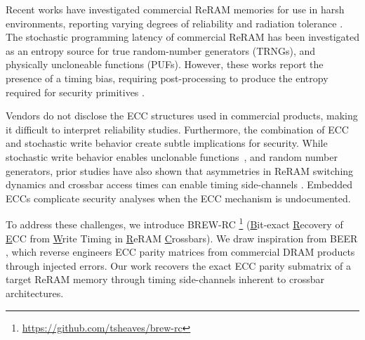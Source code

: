 

Recent works have investigated commercial ReRAM memories for use in harsh environments, reporting varying degrees of reliability and radiation tolerance \cite{yang2014reliability, bi2019total, lyu2021research, korkian2022single}. The stochastic programming latency of commercial ReRAM has been investigated as an entropy source for true random-number generators (TRNGs), and physically uncloneable functions (PUFs). However, these works report the presence of a timing bias, requiring post-processing to produce the entropy required for security primitives \cite{suri2018high, tolga2024trng}.

Vendors do not disclose the ECC structures used in commercial products, making it difficult to interpret reliability studies. 
Furthermore, the combination of ECC and stochastic write behavior create subtle implications for security. While stochastic write behavior enables unclonable functions~, and random number generators, prior studies have also shown that asymmetries in ReRAM switching dynamics and crossbar access times can enable timing side-channels \cite{kommareddy2019crossbar, khan2021comprehensive, wang2023side}. 
Embedded ECCs complicate security analyses when the ECC mechanism is undocumented. 



To address these challenges, we introduce BREW-RC \footnote{\href{https://github.com/tsheaves/brew-rc}{https://github.com/tsheaves/brew-rc}} (\underline{B}it-exact \underline{R}ecovery of \underline{E}CC from \underline{W}rite Timing in \underline{R}eRAM \underline{C}rossbars). We draw inspiration from BEER \cite{patel2020bit}, which reverse engineers ECC parity matrices from commercial DRAM products through injected errors. Our work recovers the exact ECC parity submatrix of a target ReRAM memory through timing side-channels inherent to crossbar architectures. 

